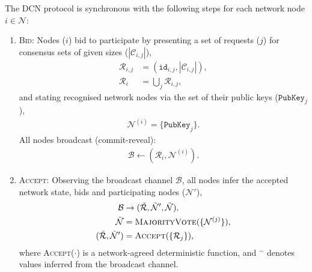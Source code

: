 \documentclass[twocolumn, aps, amsmath, amssymb, nofootinbib, superscriptaddress, longbibliography, floatfix, eqsecnum, rmp]{revtex4-2}
\begin{document}
The DCN protocol is synchronous with the following steps for each network node $i\in\mathcal{N}$:
\begin{enumerate}
	\item \textsc{Bid}: Nodes ($i$) bid to participate by presenting a set of requests ($j$) for consensus sets of given sizes ($|\mathcal{C}_{i,j}|$),
		\begin{align}
			\mathcal{R}_{i,j} &= (\mathtt{id}_{i,j},|\mathcal{C}_{i,j}|),\nonumber\\
			\mathcal{R}_i &= \bigcup_j \mathcal{R}_{i,j},
		\end{align}
		and stating recognised network nodes via the set of their public keys ($\mathtt{PubKey}_j$),
		\begin{align}
			\mathcal{N}^{(i)} = \{\mathtt{PubKey}_j\}.
		\end{align}
		All nodes broadcast (commit-reveal):
		\begin{align}
			\mathcal{B} \gets (\mathcal{R}_i, \mathcal{N}^{(i)}).
		\end{align}
	\item \textsc{Accept}: Observing the broadcast channel $\mathcal{B}$, all nodes infer the accepted network state, bids and participating nodes ($\mathcal{N}'$),
		\begin{align}
			\mathcal{B} &\to (\tilde{\mathcal{R}},\tilde{\mathcal{N}}',\tilde{\mathcal{N}}),\nonumber\\
			\tilde{\mathcal{N}} &= \textsc{MajorityVote}(\{\mathcal{N}^{(j)}\}),\nonumber\\
			(\tilde{\mathcal{R}},\tilde{\mathcal{N}}') &= \textsc{Accept}(\{\mathcal{R}_j\}),
		\end{align}
		where \textsc{Accept}($\cdot$) is a network-agreed deterministic function, and ${}^\sim$ denotes values inferred from the broadcast channel.
		

\end{enumerate}
\end{document}
